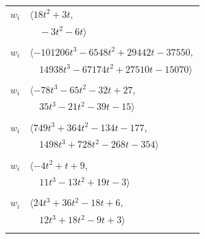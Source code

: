 \documentclass[11pt]{article}
\begin{document}
\begin{longtable}{@{}ll@{}}
$w_i$ & $\langle 18t^{2}+3t,$\\
 & $\quad -3t^{2}-6t\rangle$\\
\addlinespace[2pt]
\multicolumn{2}{@{}p{0.97\textwidth}@{}}{$i=67$, $D_i=2187$, $\rho_{ij}$: $22{:}2, \allowbreak 23{:}1, \allowbreak 26{:}2, \allowbreak 28{:}1, \allowbreak 45{:}2, \allowbreak 46{:}2, \allowbreak 49{:}2, \allowbreak 52{:}1, \allowbreak 54{:}2, \allowbreak 55{:}1, \allowbreak 58{:}2, \allowbreak 69{:}2$}\\
$w_i$ & $\langle -101206t^{3}-6548t^{2}+29442t-37550,$\\
 & $\quad 14938t^{3}-67174t^{2}+27510t-15070\rangle$\\
\addlinespace[2pt]
\multicolumn{2}{@{}p{0.97\textwidth}@{}}{$i=68$, $D_i=9$, $\rho_{ij}$: $2{:}2, \allowbreak 25{:}2, \allowbreak 33{:}1, \allowbreak 43{:}2, \allowbreak 63{:}2, \allowbreak 70{:}2, \allowbreak 71{:}1, \allowbreak 72{:}2, \allowbreak 73{:}1$}\\
$w_i$ & $\langle -78t^{3}-65t^{2}-32t+27,$\\
 & $\quad 35t^{3}-21t^{2}-39t-15\rangle$\\
\addlinespace[2pt]
\multicolumn{2}{@{}p{0.97\textwidth}@{}}{$i=69$, $D_i=27$, $\rho_{ij}$: $14{:}1, \allowbreak 23{:}2, \allowbreak 26{:}2, \allowbreak 31{:}1, \allowbreak 36{:}2, \allowbreak 38{:}2, \allowbreak 41{:}2, \allowbreak 67{:}1, \allowbreak 72{:}1$}\\
$w_i$ & $\langle 749t^{3}+364t^{2}-134t-177,$\\
 & $\quad 1498t^{3}+728t^{2}-268t-354\rangle$\\
\addlinespace[2pt]
\multicolumn{2}{@{}p{0.97\textwidth}@{}}{$i=70$, $D_i=3$, $\rho_{ij}$: $1{:}2, \allowbreak 33{:}2, \allowbreak 53{:}2, \allowbreak 63{:}1, \allowbreak 66{:}2, \allowbreak 68{:}1, \allowbreak 73{:}2$}\\
$w_i$ & $\langle -4t^{2}+t+9,$\\
 & $\quad 11t^{3}-13t^{2}+19t-3\rangle$\\
\addlinespace[2pt]
\multicolumn{2}{@{}p{0.97\textwidth}@{}}{$i=71$, $D_i=3$, $\rho_{ij}$: $3{:}1, \allowbreak 41{:}2, \allowbreak 56{:}2, \allowbreak 62{:}2, \allowbreak 68{:}2$}\\
$w_i$ & $\langle 24t^{3}+36t^{2}-18t+6,$\\
 & $\quad 12t^{3}+18t^{2}-9t+3\rangle$\\
\addlinespace[2pt]
\multicolumn{2}{@{}p{0.97\textwidth}@{}}{$i=72$, $D_i=3$, $\rho_{ij}$: $12{:}2, \allowbreak 13{:}2, \allowbreak 22{:}2, \allowbreak 25{:}1, \allowbreak 28{:}1, \allowbreak 68{:}1, \allowbreak 69{:}2$}\\

\end{longtable}
\end{document}
